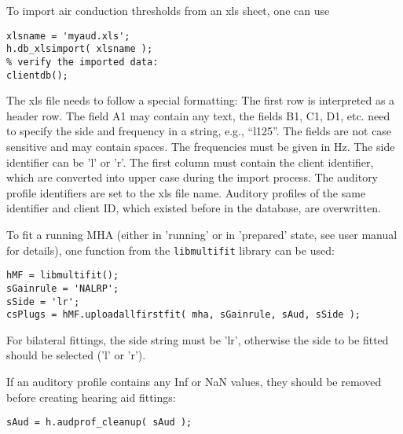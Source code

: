 \documentclass[11pt,a4paper,twoside]{article}
\begin{document}
To import air conduction thresholds from an xls sheet, one can use
\begin{verbatim}
xlsname = 'myaud.xls';
h.db_xlsimport( xlsname );
% verify the imported data:
clientdb();
\end{verbatim}
The xls file needs to follow a special formatting: The first row is
interpreted as a header row. The field A1 may contain any text, the
fields B1, C1, D1, etc. need to specify the side and frequency in a
string, e.g., ``l125''. The fields are not case sensitive and may
contain spaces. The frequencies must be given in Hz. The side
identifier can be 'l' or 'r'. The first column must contain the client
identifier, which are converted into upper case during the import
process. The auditory profile identifiers are set to the xls file
name. Auditory profiles of the same identifier and client ID, which
existed before in the database, are overwritten.

To fit a running MHA (either in 'running' or in 'prepared' state, see
user manual for details), one function from the \verb!libmultifit!
library can be used:
\begin{verbatim}
hMF = libmultifit();
sGainrule = 'NALRP';
sSide = 'lr';
csPlugs = hMF.uploadallfirstfit( mha, sGainrule, sAud, sSide );
\end{verbatim}
For bilateral fittings, the side string must be 'lr', otherwise the
side to be fitted should be selected ('l' or 'r').

If an auditory profile contains any Inf or NaN values, they should be
removed before creating hearing aid fittings:
\begin{verbatim}
sAud = h.audprof_cleanup( sAud );
\end{verbatim}



\printindex
\end{document}
